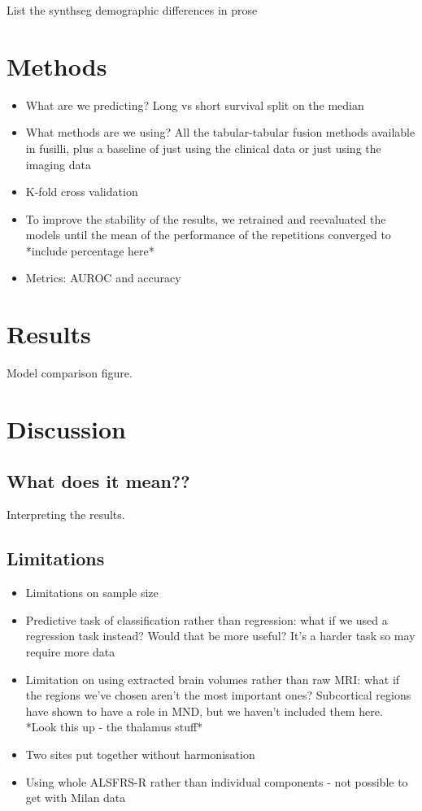List the synthseg demographic differences in prose

\section{Methods}
\begin{itemize}
    \item What are we predicting? Long vs short survival split on the median
    \item What methods are we using? All the tabular-tabular fusion methods available in fusilli, plus a baseline of just using the clinical data or just using the imaging data
    \item K-fold cross validation
    \item To improve the stability of the results, we retrained and reevaluated the models until the mean of the performance of the repetitions converged to *include percentage here*
    \item Metrics: AUROC and accuracy
\end{itemize}

\section{Results}
Model comparison figure.

\section{Discussion}
\subsection{What does it mean??}
Interpreting the results.

\subsection{Limitations}
\begin{itemize}
    \item Limitations on sample size
    \item Predictive task of classification rather than regression: what if we used a regression task instead? Would that be more useful? It's a harder task so may require more data
    \item Limitation on using extracted brain volumes rather than raw MRI: what if the regions we've chosen aren't the most important ones? Subcortical regions have shown to have a role in MND, but we haven't included them here. *Look this up - the thalamus stuff*
    \item Two sites put together without harmonisation
    \item Using whole ALSFRS-R rather than individual components - not possible to get with Milan data
\end{itemize}

